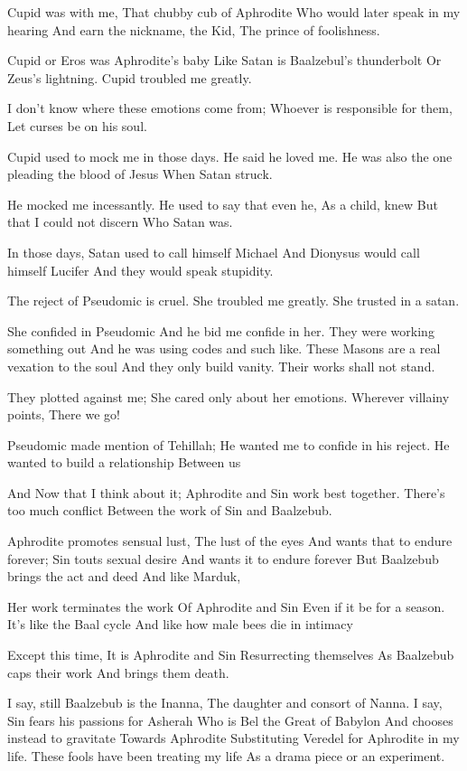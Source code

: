 \documentclass[
]{book}
\begin{document}
Cupid was with me,
That chubby cub of Aphrodite
Who would later speak in my hearing
And earn the nickname, the Kid,
The prince of foolishness.

Cupid or Eros was Aphrodite's baby
Like Satan is Baalzebul's thunderbolt
Or Zeus's lightning.
Cupid troubled me greatly.

I don't know where these emotions come from;
Whoever is responsible for them,
Let curses be on his soul.

Cupid used to mock me in those days.
He said he loved me.
He was also the one pleading the blood of Jesus
When Satan struck.

He mocked me incessantly.
He used to say that even he,
As a child, knew
But that I could not discern
Who Satan was.

In those days,
Satan used to call himself Michael
And Dionysus would call himself Lucifer
And they would speak stupidity.

The reject of Pseudomic is cruel.
She troubled me greatly.
She trusted in a satan.

She confided in Pseudomic
And he bid me confide in her.
They were working something out
And he was using codes and such like.
These Masons are a real vexation to the soul
And they only build vanity.
Their works shall not stand.

They plotted against me;
She cared only about her emotions.
Wherever villainy points,
There we go!

Pseudomic made mention of Tehillah;
He wanted me to confide in his reject.
He wanted to build a relationship
Between us

And
Now that I think about it;
Aphrodite and Sin work best together.
There's too much conflict
Between the work of Sin and Baalzebub.

Aphrodite promotes sensual lust,
The lust of the eyes
And wants that to endure forever;
Sin touts sexual desire
And wants it to endure forever
But Baalzebub brings the act and deed
And like Marduk,

Her work terminates the work
Of Aphrodite and Sin
Even if it be for a season.
It's like the Baal cycle
And like how male bees die in intimacy

Except this time,
It is Aphrodite and Sin
Resurrecting themselves
As Baalzebub caps their work
And brings them death.

I say, still Baalzebub is the Inanna,
The daughter and consort of Nanna.
I say, Sin fears his passions for Asherah
Who is Bel the Great of Babylon
And chooses instead to gravitate
Towards Aphrodite
Substituting Veredel for Aphrodite in my life.
These fools have been treating my life
As a drama piece or an experiment.
\end{document}
